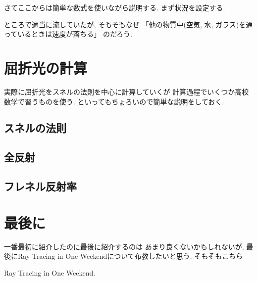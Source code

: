 \documentclass[a4paper, xelatex, ja=standard]{bxjsarticle}
\begin{document}
さてここからは簡単な数式を使いながら説明する.
まず状況を設定する.


ところで適当に流していたが, そもそもなぜ
「他の物質中(空気, 水, ガラス)を通っているときは速度が落ちる」
のだろう.

\section{屈折光の計算}
実際に屈折光をスネルの法則を中心に計算していくが
計算過程でいくつか高校数学で習うものを使う.
といってもちょろいので簡単な説明をしておく.

\subsection{スネルの法則}

\subsection{全反射}

\subsection{フレネル反射率}

\section{最後に}
一番最初に紹介したのに最後に紹介するのは
あまり良くないかもしれないが,
最後にRay Tracing in One Weekendについて布教したいと思う.
そもそもこちら

\begin{thebibliography}{9}
 Ray Tracing in One Weekend.
\end{thebibliography}
\end{document}
